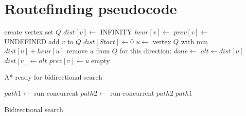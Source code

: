 \chapter{Routefinding pseudocode}\label{ch:astar}
\begin{algorithm}[H]
\begin{algorithmic}[1]
  \State create vertex set $Q$ 
  \State
   
    \State $dist[v] \gets$ INFINITY 
    \State {}
    \State
    \State $heur[v] \gets$  
    \State
    \State $prev[v] \gets$ UNDEFINED 
    \State {}
    \State
    \State add $v$ to $Q$ 
  \EndFor
  \State
  \State $dist[Start] \gets 0$
  \State
    \State $u \gets$ vertex \In $Q$ with min $dist[u] + heur[u]$
    \State remove $u$ from $Q$
    \State {}
    \State
      \State for this direction: $done \gets$ \True
      \State \Return {}
    \EndIf
    \State
     
      \State $alt \gets dist[u]$
        \State $dist[v] \gets alt$
        \State $prev[v] \gets u$
      \EndIf
    \EndFor
  \EndWhile
  \State \Return empty
\EndFunction
\end{algorithmic}
\caption{A* ready for bidirectional search}
\label{alg:bi_astar}
\end{algorithm}

\begin{algorithm}
\begin{algorithmic}[1]
  \State $path1 \gets$ run  concurrent
  \State $path2 \gets$ run  concurrent
  \State
    \State \Return $path2$
  \Else
    \State \Return $path1$
  \EndIf
\EndFunction
\end{algorithmic}
\caption{Bidirectional search}
\label{alg:bi_search}
\end{algorithm}
